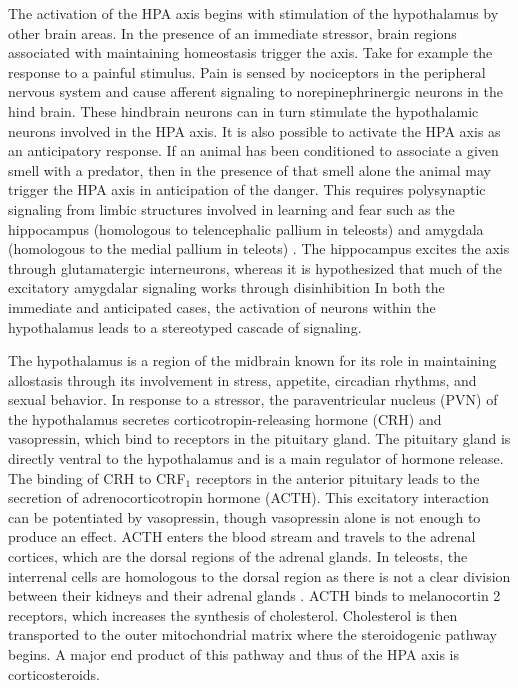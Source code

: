 \documentclass[12pt,twoside]{reedthesis}
\begin{document}
 The activation of the HPA
axis begins with stimulation of the hypothalamus by other 
brain areas. In the presence of an immediate stressor, brain regions associated with
maintaining homeostasis trigger the axis. Take for example the response to a
painful stimulus. Pain is sensed by nociceptors in the peripheral nervous system and cause afferent signaling to
norepinephrinergic neurons in the hind brain. These hindbrain neurons can in turn stimulate
the hypothalamic neurons involved in the HPA axis. It is also possible to activate the HPA axis as an
anticipatory response. If an animal has been conditioned to associate a given
smell with a predator, then in the presence of that smell
 alone the animal may trigger the HPA axis in anticipation of the danger. This requires polysynaptic signaling from limbic
structures involved in learning and fear such as the hippocampus (homologous to
telencephalic pallium in teleosts) and amygdala (homologous to the medial
pallium in teleots) \citep{salas_neuropsychology_2006}.
The hippocampus excites the axis through glutamatergic interneurons, whereas it is hypothesized that much of
the excitatory amygdalar signaling works through disinhibition 
In both the immediate and anticipated cases, the activation of neurons within the hypothalamus leads to a
stereotyped cascade of signaling.

The hypothalamus is a region of the midbrain known
for its role in maintaining allostasis through its involvement in stress,
appetite, circadian rhythms, and sexual behavior. In response to a stressor, the
paraventricular nucleus (PVN) of the hypothalamus secretes
corticotropin-releasing hormone (CRH) and vasopressin, which bind to receptors
in the pituitary gland. The pituitary gland is directly ventral to the hypothalamus and is a main
regulator of hormone release. The binding of CRH to CRF$_{1}$ receptors in the
anterior pituitary leads to the secretion of adrenocorticotropin hormone (ACTH).
This excitatory interaction can be potentiated by vasopressin, though
vasopressin alone is not enough to produce an effect. ACTH enters the blood stream and travels to the adrenal cortices, which are the dorsal
regions of the adrenal glands. In teleosts, the interrenal cells are homologous
to the dorsal region as there is not a clear division
between their kidneys and their adrenal glands \citep{pijanowski_activity_2015}. ACTH binds to melanocortin 2 receptors, which
increases the synthesis of cholesterol. Cholesterol is then transported to the
outer mitochondrial matrix where the steroidogenic pathway begins. A major end
product of this pathway and thus of the HPA axis is corticosteroids.
\end{document}
